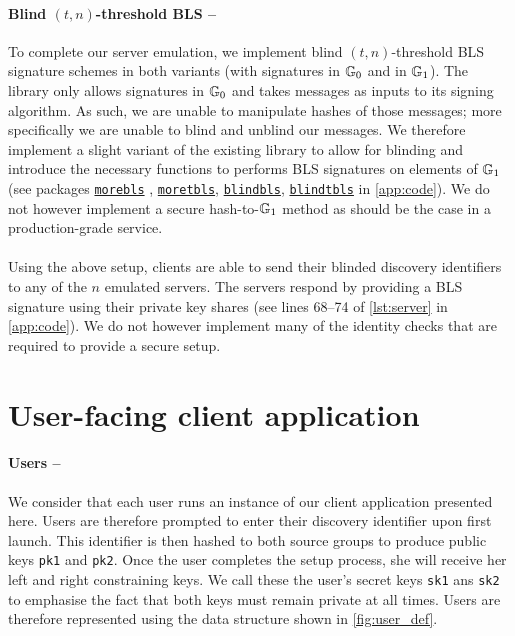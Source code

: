   	\paragraph{Blind $(t,n)$-threshold BLS --} To complete our server emulation, we implement blind $(t,n)$-threshold BLS signature schemes in both variants (with signatures in $\mathbb{G}_0$ and in $\mathbb{G}_1$). The \kyber\;library only allows signatures in $\mathbb{G}_0$ and takes messages as inputs to its signing algorithm. As such, we are unable to manipulate hashes of those messages; more specifically we are unable to blind and unblind our messages. We therefore implement a slight variant of the existing library to allow for blinding and introduce the necessary functions to performs BLS signatures on elements of $\mathbb{G}_1$  (see packages \hyperref[app:morebls]{\texttt{morebls}} , \hyperref[app:moretbls]{\texttt{moretbls}}, \hyperref[app:blindbls]{\texttt{blindbls}}, \hyperref[app:blindtbls]{\texttt{blindtbls}} in \autoref{app:code}). We do not however implement a secure hash-to-$\mathbb{G}_1$ method as should be the case in a production-grade service.
  	
  	\paragraph{} Using the above setup, clients are able to send their blinded discovery identifiers to any of the $n$ emulated servers. The servers respond by providing a BLS signature using their private key shares (see lines 68--74 of \autoref{lst:server} in \autoref{app:code}). We do not however implement many of the identity checks that are required to provide a secure setup.
  	
  	
  	  	
\section{User-facing client application}

	\paragraph{Users --} We consider that each user runs an instance of our client application presented here. Users are therefore prompted to enter their discovery identifier upon first launch. This identifier is then hashed to both source groups to produce public keys \texttt{pk1} and \texttt{pk2}. Once the user completes the setup process, she will receive her left and right constraining keys. We call these the user's secret keys \texttt{sk1} ans \texttt{sk2} to emphasise the fact that both keys must remain private at all times. Users are therefore represented using the data structure shown in \autoref{fig:user_def}.
	
